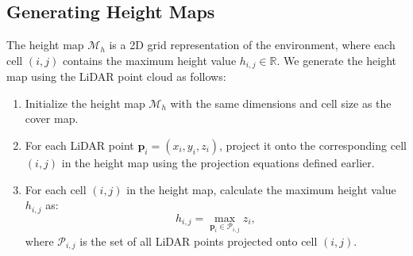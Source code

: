 
\subsection{Generating Height Maps}
The height map $\mathcal{M}_h$ is a 2D grid representation of the environment, where each cell $(i, j)$ contains the maximum height value $h_{i,j} \in \mathbb{R}$. We generate the height map using the LiDAR point cloud as follows:

\begin{enumerate}
    \item Initialize the height map $\mathcal{M}_h$ with the same dimensions and cell size as the cover map.
    \item For each LiDAR point $\mathbf{p}_i = (x_i, y_i, z_i)$, project it onto the corresponding cell $(i, j)$ in the height map using the projection equations defined earlier.
    \item For each cell $(i, j)$ in the height map, calculate the maximum height value $h_{i,j}$ as:
    \begin{equation}
    h_{i,j} = \max_{\mathbf{p}_i \in \mathcal{P}_{i,j}} z_i,
    \end{equation}
    where $\mathcal{P}_{i,j}$ is the set of all LiDAR points projected onto cell $(i, j)$.
\end{enumerate}


